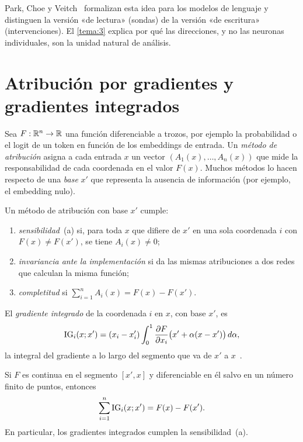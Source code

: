Park, Choe y Veitch~\cite{park} formalizan esta idea para los modelos de lenguaje y distinguen la versión «de lectura» (sondas) de la versión «de escritura» (intervenciones). El \cref{tema:3} explica por qué las direcciones, y no las neuronas individuales, son la unidad natural de análisis.

\section{Atribución por gradientes y gradientes integrados}

Sea $F:\mathbb{R}^{n}\to\mathbb{R}$ una función diferenciable a trozos, por ejemplo la probabilidad o el logit de un token en función de los embeddings de entrada. Un \emph{método de atribución} asigna a cada entrada $x$ un vector $(A_1(x),\dots,A_n(x))$ que mide la responsabilidad de cada coordenada en el valor $F(x)$. Muchos métodos lo hacen respecto de una \emph{base} $x'$ que representa la ausencia de información (por ejemplo, el embedding nulo).

\begin{definicion}\label{def:axiomas}
Un método de atribución con base $x'$ cumple:
\begin{enumerate}
  \item \emph{sensibilidad}~(a) si, para toda $x$ que difiere de $x'$ en una sola coordenada $i$ con $F(x)\neq F(x')$, se tiene $A_i(x)\neq 0$;
  \item \emph{invariancia ante la implementación} si da las mismas atribuciones a dos redes que calculan la misma función;
  \item \emph{completitud} si $\sum_{i=1}^{n}A_i(x)=F(x)-F(x')$.
\end{enumerate}
\end{definicion}

\addtocounter{definicion}{1}%

\begin{definicion}\label{def:ig}
El \emph{gradiente integrado} de la coordenada $i$ en $x$, con base $x'$, es
\[
\operatorname{IG}_i(x;x')=(x_i-x'_i)\int_{0}^{1}\frac{\partial F}{\partial x_i}\bigl(x'+\alpha(x-x')\bigr)\,d\alpha,
\]
la integral del gradiente a lo largo del segmento que va de $x'$ a $x$~\cite[§3, ec.~(1)]{sundararajan}.
\end{definicion}

\begin{proposicion}\label{prop:completitud}
Si $F$ es continua en el segmento $[x',x]$ y diferenciable en él salvo en un número finito de puntos, entonces
\[
\sum_{i=1}^{n}\operatorname{IG}_i(x;x')=F(x)-F(x').
\]
En particular, los gradientes integrados cumplen la sensibilidad~(a).
\end{proposicion}

